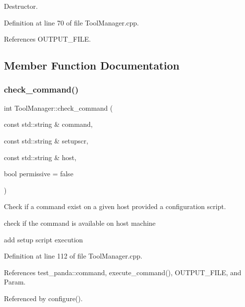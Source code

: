 Destructor. 



Definition at line 70 of file Tool\+Manager.\+cpp.



References O\+U\+T\+P\+U\+T\+\_\+\+F\+I\+LE.



\subsection{Member Function Documentation}
\mbox{\label{classToolManager_a0301402158ba7ebe5a5f81b04809b761}} 
\subsubsection{\texorpdfstring{check\+\_\+command()}{check\_command()}}
{\footnotesize\ttfamily int Tool\+Manager\+::check\+\_\+command (\begin{DoxyParamCaption}\item[{const std\+::string \&}]{command,  }\item[{const std\+::string \&}]{setupscr,  }\item[{const std\+::string \&}]{host,  }\item[{bool}]{permissive = {\ttfamily false} }\end{DoxyParamCaption})\hspace{0.3cm}{\ttfamily [protected]}}



Check if a command exist on a given host provided a configuration script. 

check if the command is available on host machine

add setup script execution 

Definition at line 112 of file Tool\+Manager.\+cpp.



References test\+\_\+panda\+::command, execute\+\_\+command(), O\+U\+T\+P\+U\+T\+\_\+\+F\+I\+LE, and Param.



Referenced by configure().

